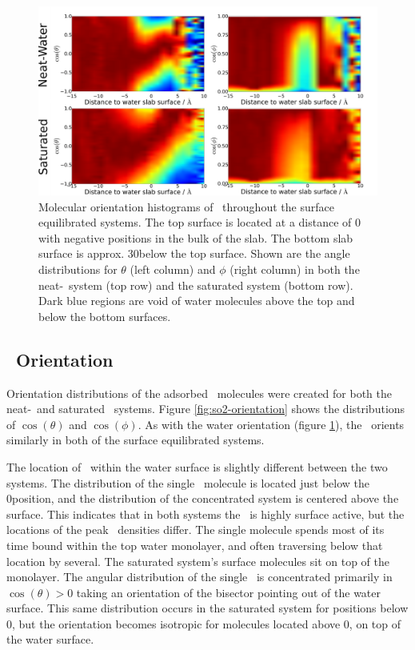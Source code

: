 \begin{figure}[h!]
	\begin{center}
		\includegraphics[scale=1.0]{images/h2o-angles/h2oangles.png}
		\caption{Molecular orientation histograms of \wat~throughout the surface equilibrated systems. The top surface is located at a distance of 0 with negative positions in the bulk of the slab. The bottom slab surface is approx. 30\angs below the top surface. Shown are the angle distributions for $\theta$ (left column) and $\phi$ (right column) in both the neat-\wat~system (top row) and the saturated system (bottom row). Dark blue regions are void of water molecules above the top and below the bottom surfaces.}
		\label{fig:water-orientation}
	\end{center}
\end{figure}

\subsection{\suldiox~Orientation}

Orientation distributions of the adsorbed \suldiox~molecules were created for both the neat-\wat~and saturated \suldiox~systems. Figure \ref{fig:so2-orientation} shows the distributions of $\cos(\theta)$ and $\cos(\phi)$. As with the water orientation (figure \ref{fig:water-orientation}), the \suldiox~orients similarly in both of the surface equilibrated systems. 

The location of \suldiox~within the water surface is slightly different between the two systems. The distribution of the single \suldiox~molecule is located just below the 0\angs position, and the distribution of the concentrated system is centered above the surface. This indicates that in both systems the \suldiox~is highly surface active, but the locations of the peak \suldiox~densities differ. The single molecule spends most of its time bound within the top water monolayer, and often traversing below that location by several\angs. The saturated system's surface molecules sit on top of the monolayer. The angular distribution of the single \suldiox~is concentrated primarily in $\cos(\theta)>0$ taking an orientation of the bisector pointing out of the water surface. This same distribution occurs in the saturated system for positions below 0\angs, but the orientation becomes isotropic for molecules located above 0\angs, on top of the water surface.




